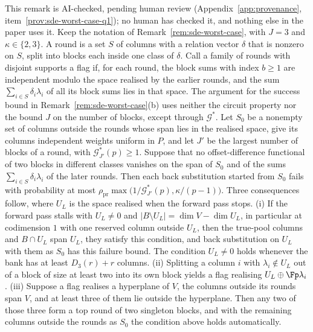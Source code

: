 \begin{remark}
\label{rem:sde-worst-case-q1}
This remark is AI-checked, pending human review (Appendix~\ref{app:provenance}, item~\ref{prov:sde-worst-case-q1}); no human has checked it, and nothing else in the paper uses it. Keep the notation of Remark~\ref{rem:sde-worst-case}, with $J=3$ and $\kappa\in\{2,3\}$. A round is a set $S$ of columns with a relation vector $\delta$ that is nonzero on $S$, split into blocks each inside one class of $\delta$. Call a family of rounds with disjoint supports a flag if, for each round, the block sums with index $b\ge1$ are independent modulo the space realised by the earlier rounds, and the sum $\sum_{i\in S}\delta_i\lambda_i$ of all its block sums lies in that space. The argument for the success bound in Remark~\ref{rem:sde-worst-case}(b) uses neither the circuit property nor the bound $J$ on the number of blocks, except through $\mathcal{G}^*$. Let $S_0$ be a nonempty set of columns outside the rounds whose span lies in the realised space, give its columns independent weights uniform in $P$, and let $J'$ be the largest number of blocks of a round, with $\mathcal{G}^*_{J'}(p)\ge1$. Suppose that no offset-difference functional of two blocks in different classes vanishes on the span of $S_0$ and of the sums $\sum_{i\in S}\delta_i\lambda_i$ of the later rounds. Then each back substitution started from $S_0$ fails with probability at most $\rho_{\mathrm{pr}}\max\bigl(1/\mathcal{G}^*_{J'}(p),\kappa/(p-1)\bigr)$. Three consequences follow, where $U_L$ is the space realised when the forward pass stops.
(i) If the forward pass stalls with $U_L\ne0$ and $|B\setminus U_L|=\dim V-\dim U_L$, in particular at codimension $1$ with one reserved column outside $U_L$, then the true-pool columns and $B\cap U_L$ span $U_L$, they satisfy this condition, and back substitution on $U_L$ with them as $S_0$ has this failure bound. The condition $U_L\ne0$ holds whenever the bank has at least $D_3(r)+r$ columns.
(ii) Splitting a column $i$ with $\lambda_i\notin U_L$ out of a block of size at least two into its own block yields a flag realising $U_L\oplus\Fp\lambda_i$.
(iii) Suppose a flag realises a hyperplane of $V$, the columns outside its rounds span $V$, and at least three of them lie outside the hyperplane. Then any two of those three form a top round of two singleton blocks, and with the remaining columns outside the rounds as $S_0$ the condition above holds automatically.

\end{remark}
